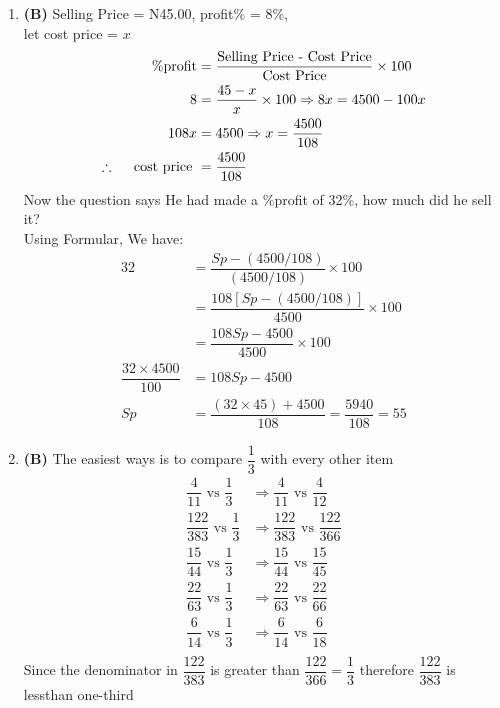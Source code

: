 \begin{multicols}{2}
\begin{enumerate}[label={\textbf{\arabic*.}}]
    \item \textbf{(B)} Selling Price = N45.00, profit\% = 8\%, \\let cost price = \(x\)
    \begin{align*}
    \%\text{profit} &= \frac{\text{Selling Price - Cost Price} }{\text{Cost Price}} \times 100 \\
         8 &= \frac{45 - x }{x} \times 100 \Rightarrow 8x = 4500 -100x\\
       108x &= 4500 \Rightarrow x = \dfrac{4500}{108}  \\
       \therefore \hspace{10px}  \text{ cost price }  &= \dfrac{4500}{108} 
    \end{align*}
       Now the question says He had made a \%profit of 32\%, how much did he sell it? \\
       Using Formular, We have: \\
       \begin{align*}
        32 &= \dfrac{Sp - (4500/108)}{(4500/108)} \times 100 \\
        &= \dfrac{108\left[Sp - (4500/108)\right]}{4500} \times 100 \\
        &=  \dfrac{108Sp - 4500}{4500} \times 100 \\
        \dfrac{32 \times 4500}{100} &= 108Sp - 4500 \\
        Sp &= \dfrac{\left(32 \times 45\right) + 4500}{108} = \dfrac{5940}{108} = 55 
    \end{align*}

    \item \textbf{(B) }The easiest ways is to compare $\dfrac{1}{3}$ with every other item \\
        \begin{align*}
            \dfrac{4}{11} \text{ vs } \dfrac{1}{3} &\Rightarrow \dfrac{4}{11} \text{ vs } \dfrac{4}{12} \\
            \dfrac{122}{383} \text{ vs } \dfrac{1}{3} &\Rightarrow \dfrac{122}{383} \text{ vs } \dfrac{122}{366} \\
            \dfrac{15}{44} \text{ vs } \dfrac{1}{3} &\Rightarrow \dfrac{15}{44} \text{ vs } \dfrac{15}{45} \\
            \dfrac{22}{63} \text{ vs } \dfrac{1}{3} &\Rightarrow \dfrac{22}{63} \text{ vs } \dfrac{22}{66} \\
            \dfrac{6}{14} \text{ vs } \dfrac{1}{3} &\Rightarrow \dfrac{6}{14} \text{ vs } \dfrac{6}{18} \\
        \end{align*}
        Since the denominator in $\dfrac{122}{383}$ is greater than $\dfrac{122}{366} = \dfrac{1}{3}$ therefore $\dfrac{122}{383}$ is lessthan one-third


\end{enumerate}
\end{multicols}
